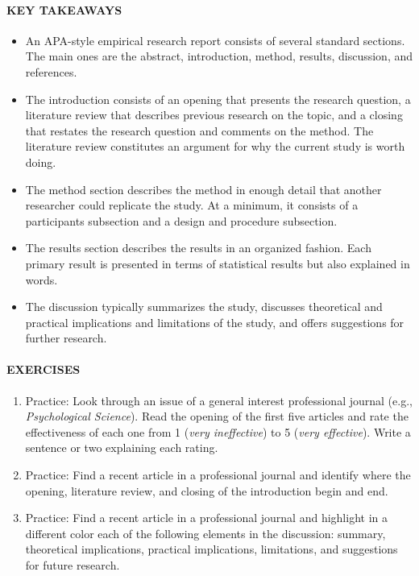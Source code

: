 \documentclass[
]{krantz}
\providecommand{\tightlist}{%
  \setlength{\itemsep}{0pt}\setlength{\parskip}{0pt}}
\begin{document}
\hypertarget{key-takeaways-32}{%
\paragraph*{KEY TAKEAWAYS}\label{key-takeaways-32}}

\begin{itemize}
\tightlist
\item
  An APA-style empirical research report consists of several standard sections. The main ones are the abstract, introduction, method, results, discussion, and references.
\item
  The introduction consists of an opening that presents the research question, a literature review that describes previous research on the topic, and a closing that restates the research question and comments on the method. The literature review constitutes an argument for why the current study is worth doing.
\item
  The method section describes the method in enough detail that another researcher could replicate the study. At a minimum, it consists of a participants subsection and a design and procedure subsection.
\item
  The results section describes the results in an organized fashion. Each primary result is presented in terms of statistical results but also explained in words.
\item
  The discussion typically summarizes the study, discusses theoretical and practical implications and limitations of the study, and offers suggestions for further research.
\end{itemize}

\hypertarget{exercises-27}{%
\paragraph*{EXERCISES}\label{exercises-27}}

\begin{enumerate}
\def\labelenumi{\arabic{enumi}.}
\tightlist
\item
  Practice: Look through an issue of a general interest professional journal (e.g., \emph{Psychological Science}). Read the opening of the first five articles and rate the effectiveness of each one from 1 (\emph{very ineffective}) to 5 (\emph{very effective}). Write a sentence or two explaining each rating.
\item
  Practice: Find a recent article in a professional journal and identify where the opening, literature review, and closing of the introduction begin and end.
\item
  Practice: Find a recent article in a professional journal and highlight in a different color each of the following elements in the discussion: summary, theoretical implications, practical implications, limitations, and suggestions for future research.
\end{enumerate}
\end{document}
